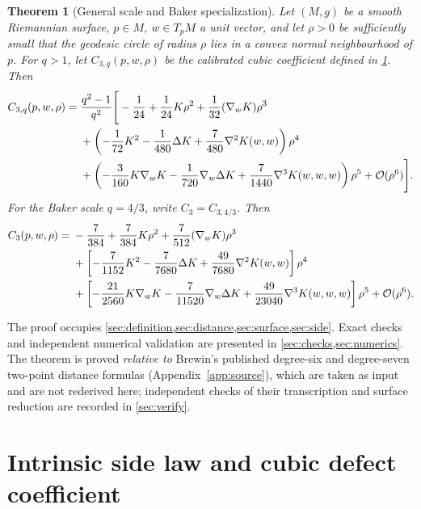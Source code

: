 \documentclass[11pt]{amsart}
\numberwithin{equation}{section}
\newtheorem{theorem}{Theorem}[section]
\theoremstyle{remark}
\newcommand{\bigO}{\mathcal{O}}
\newcommand{\Hess}{\nabla^2}
\newcommand{\Third}{\nabla^3}
\begin{document}
\begin{theorem}[General scale and Baker specialization]\label{thm:main}
Let $(M,g)$ be a smooth Riemannian surface, $p\in M$, $w\in T_pM$ a unit vector, and let $\rho>0$ be sufficiently small that the geodesic circle of radius $\rho$ lies in a convex normal neighbourhood of $p$.  For $q>1$, let $C_{3,q}(p,w,\rho)$ be the calibrated cubic coefficient defined in \cref{sec:definition}.  Then
\begin{align}
C_{3,q}(p,w,\rho)
={}&\frac{q^2-1}{q^2}\Bigg[
-\frac1{24}+\frac1{24}K\rho^2+\frac1{32}(\nabla_wK)\rho^3 \notag\\
&+\left(-\frac1{72}K^2-\frac1{480}\Delta K
+\frac7{480}\Hess K(w,w)\right)\rho^4 \notag\\
&+\left(-\frac3{160}K\nabla_wK
-\frac1{720}\nabla_w\Delta K
+\frac7{1440}\Third K(w,w,w)\right)\rho^5
+\bigO(\rho^6)\Bigg].
\label{eq:general-main}
\end{align}
For the Baker scale $q=4/3$, write $C_3=C_{3,4/3}$.  Then
\begin{align}
C_3(p,w,\rho)
={}&-\frac7{384}+\frac7{384}K\rho^2
+\frac7{512}(\nabla_wK)\rho^3 \notag\\
&+\left[-\frac7{1152}K^2-\frac7{7680}\Delta K
+\frac{49}{7680}\Hess K(w,w)\right]\rho^4 \notag\\
&+\left[-\frac{21}{2560}K\nabla_wK
-\frac7{11520}\nabla_w\Delta K
+\frac{49}{23040}\Third K(w,w,w)\right]\rho^5
+\bigO(\rho^6).
\label{eq:baker-main}
\end{align}
\end{theorem}

The proof occupies \cref{sec:definition,sec:distance,sec:surface,sec:side}.  Exact checks and independent numerical validation are presented in \cref{sec:checks,sec:numerics}.  The theorem is proved \emph{relative to} Brewin's published degree-six and degree-seven two-point distance formulas (Appendix~\ref{app:source}), which are taken as input and are not rederived here; independent checks of their transcription and surface reduction are recorded in \cref{sec:verify}.

\section{Intrinsic side law and cubic defect coefficient}\label{sec:definition}
\end{document}
